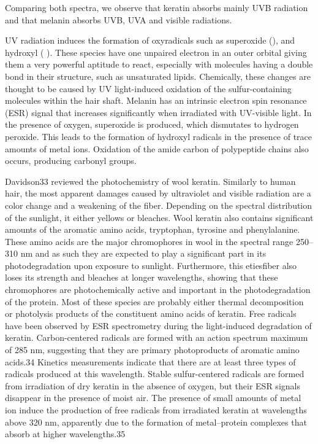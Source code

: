 \documentclass[]{interact}
\theoremstyle{plain}%
\theoremstyle{definition}
\theoremstyle{remark}
\begin{document}


Comparing both spectra, we observe that
keratin absorbs mainly UVB radiation and that melanin absorbs UVB, UVA and visible radiations. \cite{Santos2004}



UV radiation induces the formation of oxyradicals such as superoxide (), and hydroxyl ( ). These species have one unpaired electron in an outer orbital giving them a very powerful aptitude to react, especially with molecules having a double bond in their structure, such as unsaturated lipids. Chemically, these changes are thought to be caused by UV light-induced oxidation of the sulfur-containing molecules within the hair shaft. Melanin has an intrinsic electron spin resonance (ESR) signal that increases significantly when irradiated with UV-visible light. In the presence of oxygen, superoxide is produced, which dismutates to hydrogen peroxide. This leads to the formation of hydroxyl radicals in the presence of trace amounts of metal ions. Oxidation of the amide carbon of polypeptide chains also occurs, producing carbonyl groups. \cite{Nogueira2006}

Davidson33 reviewed the photochemistry of wool keratin. Similarly to human hair, the most apparent damages caused by ultraviolet and visible radiation are a color change and a weakening of the fiber. Depending on the spectral distribution of the sunlight, it either yellows or bleaches. Wool keratin also contains significant amounts of the aromatic amino acids, tryptophan, tyrosine and phenylalanine. These amino acids are the major chromophores in wool in the spectral range 250–310 nm and as such they are expected to play a significant part in its photodegradation upon exposure to sunlight. Furthermore, this etiesfiber also loses its strength and bleaches at longer wavelengths, showing that these chromophores are photochemically active and important in the photodegradation of the protein. Most of these species are probably either thermal decomposition or photolysis products of the constituent amino acids of keratin. Free radicals have been observed by ESR spectrometry during the light-induced degradation of keratin. Carbon-centered radicals are formed with an action spectrum maximum of 285 nm, suggesting that they are primary photoproducts of aromatic amino acids.34 Kinetics measurements indicate that there are at least three types of radicals produced at this wavelength. Stable sulfur-centered radicals are formed from irradiation of dry keratin in the absence of oxygen, but their ESR signals disappear in the presence of moist air. The presence of small amounts of metal ion induce the production of free radicals from irradiated keratin at wavelengths above 320 nm, apparently due to the formation of metal–protein complexes that absorb at higher wavelengths.35
\end{document}
